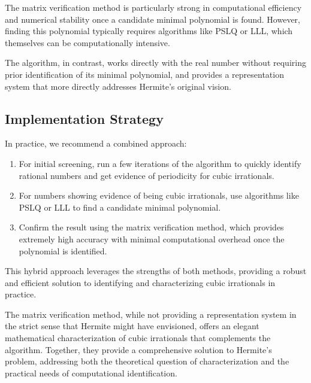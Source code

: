 The matrix verification method is particularly strong in computational efficiency and numerical stability once a candidate minimal polynomial is found. However, finding this polynomial typically requires algorithms like PSLQ or LLL, which themselves can be computationally intensive.

The \HAPD{} algorithm, in contrast, works directly with the real number without requiring prior identification of its minimal polynomial, and provides a representation system that more directly addresses Hermite's original vision.

\subsection{Implementation Strategy}

In practice, we recommend a combined approach:
\begin{enumerate}
    \item For initial screening, run a few iterations of the \HAPD{} algorithm to quickly identify rational numbers and get evidence of periodicity for cubic irrationals.
    \item For numbers showing evidence of being cubic irrationals, use algorithms like PSLQ or LLL to find a candidate minimal polynomial.
    \item Confirm the result using the matrix verification method, which provides extremely high accuracy with minimal computational overhead once the polynomial is identified.
\end{enumerate}

This hybrid approach leverages the strengths of both methods, providing a robust and efficient solution to identifying and characterizing cubic irrationals in practice.

\begin{remark}
The matrix verification method, while not providing a representation system in the strict sense that Hermite might have envisioned, offers an elegant mathematical characterization of cubic irrationals that complements the \HAPD{} algorithm. Together, they provide a comprehensive solution to Hermite's problem, addressing both the theoretical question of characterization and the practical needs of computational identification.
\end{remark}
